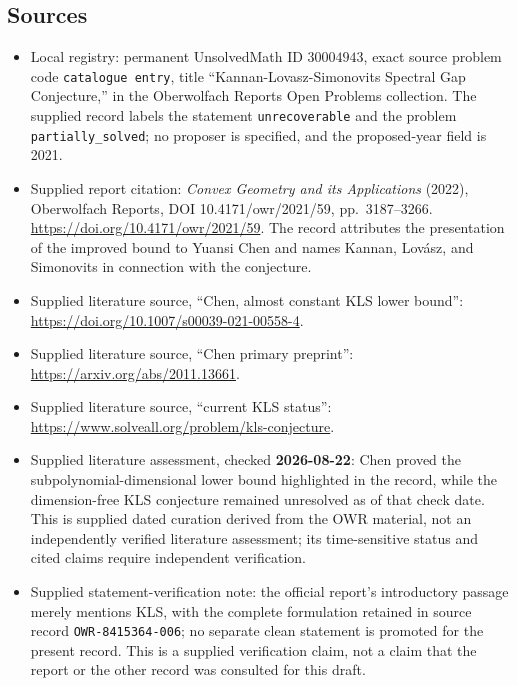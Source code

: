 \documentclass[11pt]{article}
\begin{document}
\subsection{Sources}
\begin{itemize}
\item Local registry: permanent UnsolvedMath ID \(30004943\), exact source problem code \texttt{catalogue entry}, title ``Kannan-Lovasz-Simonovits Spectral Gap Conjecture,'' in the Oberwolfach Reports Open Problems collection. The supplied record labels the statement \texttt{unrecoverable} and the problem \texttt{partially\_solved}; no proposer is specified, and the proposed-year field is 2021.
\item Supplied report citation: \emph{Convex Geometry and its Applications} (2022), Oberwolfach Reports, DOI 10.4171/owr/2021/59, pp.~3187--3266. \url{https://doi.org/10.4171/owr/2021/59}. The record attributes the presentation of the improved bound to Yuansi Chen and names Kannan, Lov\'asz, and Simonovits in connection with the conjecture.
\item Supplied literature source, ``Chen, almost constant KLS lower bound'': \url{https://doi.org/10.1007/s00039-021-00558-4}.
\item Supplied literature source, ``Chen primary preprint'': \url{https://arxiv.org/abs/2011.13661}.
\item Supplied literature source, ``current KLS status'': \url{https://www.solveall.org/problem/kls-conjecture}.
\item Supplied literature assessment, checked \textbf{2026-08-22}: Chen proved the subpolynomial-dimensional lower bound highlighted in the record, while the dimension-free KLS conjecture remained unresolved as of that check date. This is supplied dated curation derived from the OWR material, not an independently verified literature assessment; its time-sensitive status and cited claims require independent verification.
\item Supplied statement-verification note: the official report's introductory passage merely mentions KLS, with the complete formulation retained in source record \texttt{OWR-8415364-006}; no separate clean statement is promoted for the present record. This is a supplied verification claim, not a claim that the report or the other record was consulted for this draft.
\end{itemize}
\end{document}
